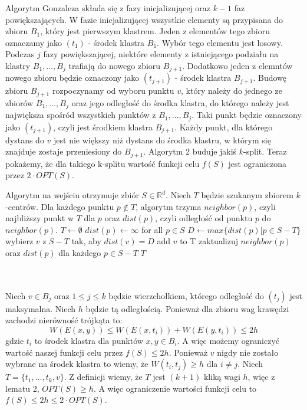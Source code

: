 \noindent
Algorytm Gonzaleza składa się z fazy inicjalizującej oraz $k-1$ faz powiększających.
W fazie inicjalizującej wszystkie elementy są przypisana do zbioru $B_{1}$, który jest pierwszym klastrem.
Jeden z elementów tego zbioru oznaczamy jako $(t_{1})$ - środek klastra $B_{1}$.
Wybór tego elementu jest losowy.
Podczas $j$ fazy powiększającej, niektóre elementy z istniejącego podziału na klastry $B_{1}, \dots, B_{j}$ trafiają do nowego zbioru $B_{j+1}$.
Dodatkowo jeden z elemntów nowego zbioru będzie oznaczony jako $(t_{j+1})$ - środek klastra $B_{j+1}$.
Budowę zbioru $B_{j+1}$ rozpoczynamy od wyboru punktu $v$, który należy do jednego ze zbiorów $B_{1}, \dots, B_{j}$ oraz jego odległość do środka klastra, do którego należy jest największa spośród wszystkich punktów z $B_{1}, \dots, B_{j}$. 
Taki punkt będzie oznaczony jako $(t_{j+1})$, czyli jest środkiem klastra $B_{j+1}$.
Każdy punkt, dla którego dystans do $v$ jest nie większy niż dystans do środka klastru, w którym się znajduje zostaje przeniesiony do $B_{j+1}$.
Algorytm 2 buduje jakiś $k$-split.
Teraz pokażemy, że dla takiego k-splitu wartość funkcji celu $f(S)$ jest ograniczona przez $2 \cdot OPT(S)$.
\begin{algorithm}
    \caption{}
\begin{algorithmic}
    \State Algorytm na wejściu otrzymuje zbiór $S \in \mathbb{R}^{d}$.
    \State Niech $T$ będzie szukanym zbiorem $k$-centrów.
    \State Dla każdego punktu $p \notin T$, algorytm trzyma $neighbor(p)$, czyli najbliższy punkt w $T$ dla $p$ oraz $dist(p)$, czyli odległość od punktu $p$ do $neighbor(p)$.
        \State $T \leftarrow \emptyset$
        \State $dist(p) \leftarrow \infty$ for all $p \in S$
            \State $D \leftarrow max\{dist(p) | p \in S-T\}$
            \State wybierz $v$ z $S-T$ tak, aby $dist(v) = D$
            \State add $v$ to T
            \State zaktualizuj $neighbor(p)$ oraz $dist(p)$ dla każdego $p \in S-T$
        \EndWhile
    \EndProcedure
    \Return $T$
\end{algorithmic}
\end{algorithm}
\\~\\
Niech $v \in B_{j}$ oraz $1 \leq j \leq k$ będzie wierzchołkiem, którego odległość do $(t_{j})$ jest maksymalna.
Niech $h$ będzie tą odległością.
Ponieważ dla zbioru wag krawędzi zachodzi nierówność trójkąta to:
\begin{equation}
    W(E(x, y)) \leq W(E(x, t_{i})) + W(E(y, t_{i})) \leq 2h
\end{equation}
gdzie $t_{i}$ to środek klastra dla punktów $x, y \in B_{i}$.
A więc możemy ograniczyć wartość naszej funkcji celu przez $f(S) \leq 2h$.
Ponieważ $v$ nigdy nie zostało wybrane na środek klastra to wiemy, że $W(t_{i}, t_{j}) \geq h$ dla $i \neq j$.
Niech $T = \{ t_{1}, \dots, t_{k}, v \}$.
Z definicji wiemy, że $T$ jest $(k+1)$ kliką wagi $h$, więc z lematu 2, $OPT(S) \geq h$.
A więc ograniczenie wartości funkcji celu to $ f(S) \leq 2h \leq 2 \cdot OPT(S)$.